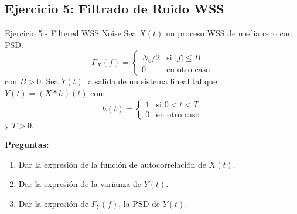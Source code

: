 \documentclass[10pt,a4paper]{article}
\begin{document}
\newpage
\subsection{Ejercicio 5: Filtrado de Ruido WSS}

\begin{ejercicio}{Ejercicio 5 - Filtered WSS Noise}
Sea $X(t)$ un proceso WSS de media cero con PSD:
\[
\Gamma_X(f) = \begin{cases}
N_0/2 & \text{si } |f| \leq B\\
0 & \text{en otro caso}
\end{cases}
\]
con $B > 0$. Sea $Y(t)$ la salida de un sistema lineal tal que $Y(t) = (X * h)(t)$ con:
\[
h(t) = \begin{cases}
1 & \text{si } 0 < t < T\\
0 & \text{en otro caso}
\end{cases}
\]
y $T > 0$.

\textbf{Preguntas:}
\begin{enumerate}
\item Dar la expresión de la función de autocorrelación de $X(t)$.
\item Dar la expresión de la varianza de $Y(t)$.
\item Dar la expresión de $\Gamma_Y(f)$, la PSD de $Y(t)$.
\end{enumerate}
\end{ejercicio}
\end{document}
